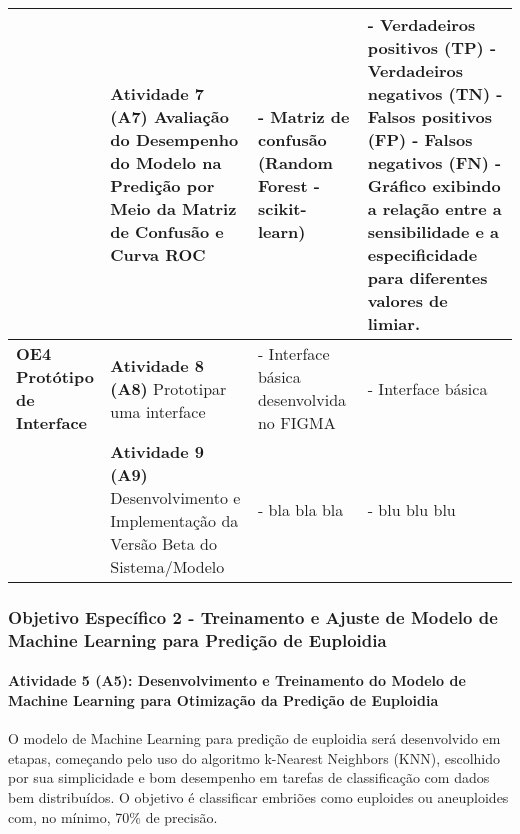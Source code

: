 \begin{table}[h!]
{\begin{tabular}{|p{3cm}|p{4cm}|p{3cm}|p{5cm}|}
      & 
      \textcolor[HTML]{133E78}{\textbf{Atividade 7 (A7)}} \newline
      Avaliação do Desempenho do Modelo na Predição por Meio da Matriz de Confusão e Curva ROC &
      - Matriz de confusão (Random Forest - scikit-learn) &
      - Verdadeiros positivos (TP) \newline
      - Verdadeiros negativos (TN) \newline
      - Falsos positivos (FP) \newline
      - Falsos negativos (FN) \newline
      - Gráfico exibindo a relação entre a sensibilidade e a especificidade para diferentes valores de limiar. \\
      \hline

      \parbox[c]{\linewidth}{
        \vspace{0.2cm}
        \centering
        \textcolor[HTML]{133E78}{\textbf{
          OE4 \\[0.1cm]
          Protótipo de \\[0.1cm]
          Interface
        }}
      }
      & 
      \textcolor[HTML]{133E78}{\textbf{Atividade 8 (A8)}} \newline
      Prototipar uma interface &
      - Interface básica desenvolvida no FIGMA &
      - Interface básica \\
      \hline
      &
      \textcolor[HTML]{133E78}{\textbf{Atividade 9 (A9)}} \newline
      Desenvolvimento e Implementação da Versão Beta do Sistema/Modelo &
      - bla bla bla &
      - blu blu blu \\
      \hline
    \end{tabular}
  }
\end{table}
\FloatBarrier


\subsubsection{\textbf{Objetivo Específico 2} - Treinamento e Ajuste de Modelo de Machine Learning para Predição de Euploidia}

\paragraph{\textbf{Atividade 5 (A5):} Desenvolvimento e Treinamento do Modelo de Machine Learning para Otimização da Predição de Euploidia}

O modelo de Machine Learning para predição de euploidia será desenvolvido em etapas, começando pelo uso do algoritmo k-Nearest Neighbors (KNN), escolhido por sua simplicidade e bom desempenho em tarefas de classificação com dados bem distribuídos. O objetivo é classificar embriões como euploides ou aneuploides com, no mínimo, 70\% de precisão.


